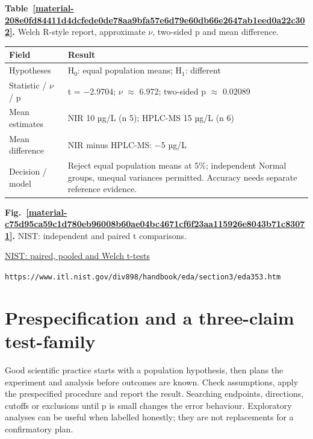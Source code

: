 \documentclass[11pt,a4paper]{article}
\newcounter{scripttable}
\begin{document}
\par\medskip
{}
\label{material-208e0fd84411d4dcfede0de78aa9bfa57e6d79e60db66e2647ab1eed0a22c302}
\noindent\textbf{Table~\ref*{material-208e0fd84411d4dcfede0de78aa9bfa57e6d79e60db66e2647ab1eed0a22c302}.} Welch R-style report, approximate \ensuremath{\nu}, two-sided p and mean difference.\par\nopagebreak
\begin{longtable}{@{}p{}p{}@{}}
Field & Result \\ \hline
\endhead
Hypotheses & H\ensuremath{{}_0}: equal population means; H\ensuremath{{}_1}: different \\ \hline
Statistic / \ensuremath{\nu} / p & t = \ensuremath{-}2.9704; \ensuremath{\nu} \ensuremath{\approx} 6.972; two-sided p \ensuremath{\approx} 0.02089 \\ \hline
Mean estimates & NIR 10 µg/L (n 5); HPLC-MS 15 µg/L (n 6) \\ \hline
Mean difference & NIR minus HPLC-MS: \ensuremath{-}5 µg/L \\ \hline
Decision / model & Reject equal population means at 5\%; independent Normal groups, unequal variances permitted. Accuracy needs separate reference evidence. \\ \hline
\end{longtable}
\medskip

\par\medskip
\Needspace{10cm}
\label{material-c75d95ca59c1d780eb96008b60ae04bc4671cf6f23aa115926e8043b71c83071}
\noindent\textbf{Fig.~\ref*{material-c75d95ca59c1d780eb96008b60ae04bc4671cf6f23aa115926e8043b71c83071}.} NIST: independent and paired t comparisons.\par\nopagebreak
\noindent\href{https://www.itl.nist.gov/div898/handbook/eda/section3/eda353.htm}{NIST: paired, pooled and Welch t-tests}\par
\nolinkurl{https://www.itl.nist.gov/div898/handbook/eda/section3/eda353.htm}\par

\medskip

\clearpage
\section{Prespecification and a three-claim test-family}
Good scientific practice starts with a population hypothesis, then plans the experiment and analysis before outcomes are known. Check assumptions, apply the prespecified procedure and report the result. Searching endpoints, directions, cutoffs or exclusions until p is small changes the error behaviour. Exploratory analyses can be useful when labelled honestly; they are not replacements for a confirmatory plan.
\end{document}
